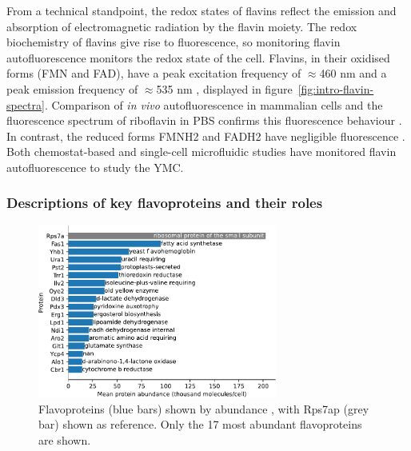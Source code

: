 From a technical standpoint, the redox states of flavins reflect the emission and absorption of electromagnetic radiation by the flavin moiety.
The redox biochemistry of flavins give rise to fluorescence, so monitoring flavin autofluorescence monitors the redox state of the cell.
Flavins, in their oxidised forms (FMN and FAD), have a peak excitation frequency of $\approx$460 nm and a peak emission frequency of $\approx$535 nm \parencite{maslankaAutofluorescenceYeastSaccharomyces2018, wagnieresVivoFluorescenceSpectroscopy1998}, displayed in figure~\ref{fig:intro-flavin-spectra}.
Comparison of \emph{in vivo} autofluorescence in mammalian cells and the fluorescence spectrum of riboflavin in PBS confirms this fluorescence behaviour \parencite{aubinAutofluorescenceViableCultured1979}.
In contrast, the reduced forms FMNH2 and FADH2 have negligible fluorescence \parencite{mastersConfocalRedoxImaging1994}.
Both chemostat-based \parencite{sasidharanTimeStructureYeastMetabolism2012, murrayRedoxRegulationRespiring2011} and single-cell microfluidic studies \parencite{baumgartnerFlavinbasedMetabolicCycles2018} have monitored flavin autofluorescence to study the YMC.

\subsubsection{Descriptions of key flavoproteins and their roles}
\label{subsubsec:intro-flavin-biochem-descriptions}

\begin{figure}
  \centering
  \includegraphics[width=0.7\textwidth]{flavoprotein_abundance_bar}
  \caption{
    Flavoproteins (blue bars) shown by abundance \citep{hoUnificationProteinAbundance2018}, with Rps7ap (grey bar) shown as reference.
    Only the 17 most abundant flavoproteins are shown.
    }
  \label{fig:intro-flavoprotein-abundance}
\end{figure}

